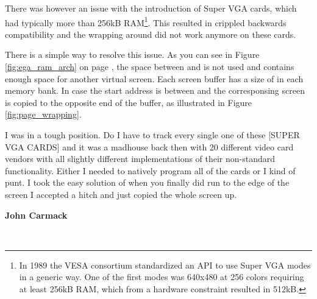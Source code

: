 \documentclass[book.tex]{subfiles}
\begin{document}
There was however an issue with the introduction of Super VGA cards, which had typically more than 256kB RAM\footnote{In 1989 the VESA consortium standardized an API to use Super VGA modes in a generic way. One of the first modes was 640x480 at 256 colors requiring at least 256kB RAM, which from a hardware constraint resulted in 512kB.}. This resulted in crippled backwards compatibility and the wrapping around  did not work anymore on these cards. \\
\par
There is a simple way to resolve this issue. As you can see in Figure \ref{fig:ega_ram_arch} on page \pageref{fig:ega_ram_arch}, the space between  and  is not used and contains enough space for another virtual screen. Each screen buffer has a size of  in each memory bank. In case the start address is between  and  the corresponsing screen is copied to the opposite end of the buffer, as illustrated in Figure \ref{fig:page_wrapping}.\\

\par

\begin{fancyquotes}
I was in a tough position. Do I have to track every single one of these [SUPER VGA CARDS] and it was a madhouse back then with 20 different video card vendors with all slightly different implementations of their non-standard functionality. Either I needed to natively program all of the cards or I kind of punt. I took the easy solution of when you finally did run to the edge of the screen I accepted a hitch and just copied the whole screen up.\\
\par
\textbf{John Carmack}
\end{fancyquotes}\\
\end{document}
